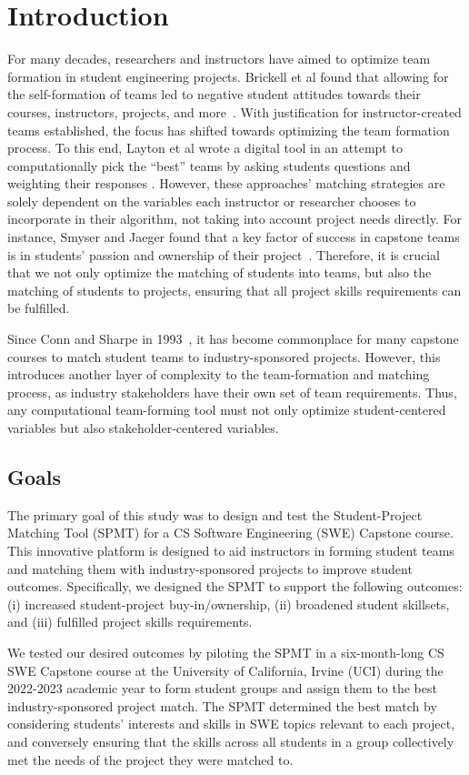 \section{Introduction}


For many decades, researchers and instructors have aimed to optimize team formation in student engineering projects. Brickell et al found that allowing for the self-formation of teams led to negative student attitudes towards their courses, instructors, projects, and more~\cite{brickell_assigning_1994}. With justification for instructor-created teams established, the focus has shifted towards optimizing the team formation process. To this end, Layton et al wrote a digital tool in an attempt to computationally pick the ``best'' teams by asking students questions and weighting their responses \cite{layton_design_2010}. However, these approaches' matching strategies are solely dependent on the variables each instructor or researcher chooses to incorporate in their algorithm, not taking into account project needs directly. For instance, Smyser and Jaeger found that a key factor of success in capstone teams is in students' passion and ownership of their project~\cite{smyser_how_2015}. 
Therefore, it is crucial that we not only optimize the matching of students into teams, but also the matching of students to projects, ensuring that all project skills requirements can be fulfilled.

Since Conn and Sharpe in 1993~\cite{conn_industry-sponsored_1993}, it has become commonplace for many capstone courses to match student teams to industry-sponsored projects. However, this introduces another layer of complexity to the team-formation and matching process, as industry stakeholders have their own set of team requirements. Thus, any computational team-forming tool must not only optimize student-centered variables but also stakeholder-centered variables.

\subsection{Goals}

The primary goal of this study was to design and test the Student-Project Matching Tool (SPMT) for a CS Software Engineering (SWE) Capstone course. This innovative platform is designed to aid instructors in forming student teams and matching them with industry-sponsored projects to improve student outcomes. Specifically, we designed the SPMT to support the following outcomes: (i) increased student-project buy-in/ownership, (ii) broadened student skillsets, and (iii) fulfilled project skills requirements.


We tested our desired outcomes by piloting the SPMT in a six-month-long CS SWE Capstone course at the University of California, Irvine (UCI) during the 2022-2023 academic year to form student groups and assign them to the best industry-sponsored project match. The SPMT determined the best match by considering students' interests and skills in SWE topics relevant to each project, and conversely ensuring that the skills across all students in a group collectively met the needs of the project they were matched to.


